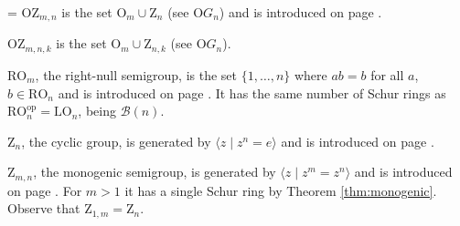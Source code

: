 \documentclass{article}
\makeatletter
\newcommand{\hangpara}[2]{\hangindent#1\hangafter#2\noindent}
\newenvironment{hangparas}[2]{\setlength{\parindent}{\z@}
  \everypar={\hangpara{#1}{#2}}}{\par}
\theoremstyle{plain}
\theoremstyle{definition}
\newcommand{\thmref}[1]{Theorem \ref{#1}}
\newcommand{\B}{\mathscr{B}}
\renewcommand{\O}{\mathrm{O}}
\newcommand{\LO}{\mathrm{LO}}
\newcommand{\RO}{\mathrm{RO}}
\newcommand{\z}{\mathrm{Z}}
\newcommand{\OZ}{\mathrm{OZ}}
\makeatother
\begin{document}
\begin{hangparas}{15pt}{1}
$\OZ_{m,n}$ is the set $\O_m\cup\z_n$ (see $\O G_n$) and is introduced on page \pageref{oz2}.

$\OZ_{m, n, k}$ is the set $\O_m\cup \z_{n,k}$ (see $\O G_n$).%

$\RO_m$, the right-null semigroup, is the set $\{1, \ldots, n\}$ where $ab=b$ for all $a$, $b\in\RO_n$ and is introduced on page \pageref{rnull}. It has the same number of Schur rings as $\RO_n^\text{op} = \LO_n$, being $\B(n)$.





$\z_n$, the cyclic group, is generated by $\langle z \mid z^n=e\rangle$ and is introduced on page \pageref{Cg}.


$\z_{m,n}$, the monogenic semigroup, is generated by $\langle z \mid z^m=z^n\rangle$ and is introduced on page \pageref{zmn}. For $m>1$ it has a single Schur ring by \thmref{thm:monogenic}. Observe that $\z_{1,m}=\z_n$.
\end{hangparas}



\end{document}
